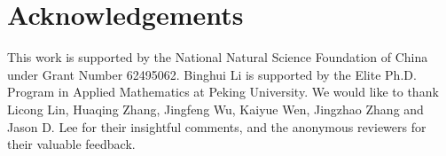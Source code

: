 


\section*{Acknowledgements}
This work is supported by the National Natural Science Foundation of China under Grant Number 62495062. Binghui Li is supported by the Elite Ph.D. Program in Applied Mathematics at Peking University. We would like to thank Licong Lin, Huaqing Zhang, Jingfeng Wu, Kaiyue Wen, Jingzhao Zhang and Jason D. Lee for their insightful comments, and the
anonymous reviewers for their valuable feedback.
